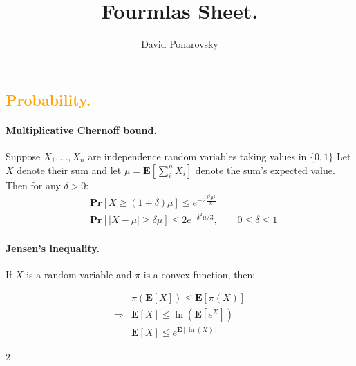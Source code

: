 \documentclass{article}
\newcommand{\prb}[1]{ \mathbf{Pr} \left[ {#1} \right]}
\newcommand{\expp}[1]{ \mathbf{E} \left[ {#1} \right]}
\begin{document}
\title{Fourmlas Sheet.} 
\author{David Ponarovsky}
\maketitle
\begin{multicols*}{2}
  \subsection*{{\textcolor{orange}{Probability.}} } 
\paragraph{Multiplicative Chernoff bound.} Suppose $ X_1, ..., X_n$ are independence random variables taking values in $\{0, 1\}$ Let $X$ denote their sum and let $\mu = \expp{\sum_{i}^{n}{X_{i}}} $  denote the sum's expected value. Then for any $\delta > 0$: 
\begin{equation*}
    \begin{split}
     & \prb{X \ge \left( 1+\delta \right) \mu }  \le e^{-2\frac{\delta^2\mu^{2}}{n}} \\ 
     & \prb{|X - \mu| \ge \delta\mu }  \le 2e^{-\delta^2\mu/3}, \qquad 0 \le \delta \le 1
    \end{split}
  \end{equation*}
  \paragraph{Jensen's inequality.} If $X$ is a random variable and $\pi$ is a convex function, then:

  \begin{equation*}
    \begin{split}
      & \pi\left( \expp{X} \right) \le \expp{\pi\left( X \right)}\\
      \Rightarrow & \expp{X} \le \ln\left(\expp{e^{X}}  \right) \\ 
      &  \expp{X} \le e^{\expp{\ln \left( X \right)}} 
    \end{split}
  \end{equation*}
\end{multicols*}{2}
\end{document}
